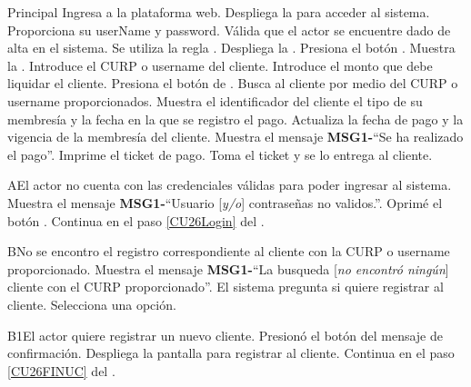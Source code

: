 	\begin{UCtrayectoria}{Principal}
		\UCpaso[\UCactor] Ingresa a la plataforma web.
		\UCpaso Despliega la  \label{CU26Login} para acceder al sistema.
		\UCpaso[\UCactor] Proporciona su userName y password. 
		\UCpaso Válida que el actor se encuentre dado de alta en el sistema. Se utiliza la regla  .
		\UCpaso Despliega la . \label{CU26PantallaRecepcionista}
		\UCpaso[\UCactor] Presiona el botón .
		\UCpaso Muestra la . \label{CU26RegistroPago}
		\UCpaso[\UCactor] Introduce el CURP o username del cliente.
		\UCpaso[\UCactor] Introduce el monto que debe liquidar el cliente.
		\UCpaso[\UCactor] Presiona el botón de . 
		\UCpaso Busca al cliente por medio del CURP o username proporcionados. 
		\UCpaso Muestra el identificador del cliente el tipo de su membresía y la fecha en la que se registro el pago.
		\UCpaso Actualiza la fecha de pago y la vigencia de la membresía del cliente.
		\UCpaso Muestra el mensaje {\bf MSG1-}``Se ha realizado el pago''.
		\UCpaso Imprime el ticket de pago.
		\UCpaso[\UCactor] Toma el ticket y se lo entrega al cliente.
		\label{CU26FINUC}
	\end{UCtrayectoria}
		
		\begin{UCtrayectoriaA}{A}{El actor no cuenta con las credenciales válidas para poder ingresar al sistema.}
			\UCpaso Muestra el mensaje {\bf MSG1-}``Usuario [{\em y/o}] contraseñas no validos.''.
			\UCpaso[\UCactor] Oprimé el botón .
			\UCpaso Continua en el paso \ref{CU26Login} del .
		\end{UCtrayectoriaA}
		
		\begin{UCtrayectoriaA}{B}{No se encontro el registro correspondiente al cliente con la CURP o username proporcionado.}
			\UCpaso Muestra el mensaje {\bf MSG1-}``La busqueda [{\em no encontró ningún}] cliente con el CURP proporcionado''.
			\UCpaso El sistema pregunta si quiere registrar al cliente.
			\UCpaso[\UCactor] Selecciona una opción.   
		\end{UCtrayectoriaA}

		\begin{UCtrayectoriaA}{B1}{El actor quiere registrar un nuevo cliente.}
			\UCpaso[\UCactor] Presionó el botón  del mensaje de confirmación.
			\UCpaso Despliega la pantalla para registrar al cliente.
			\UCpaso Continua en el paso \ref{CU26FINUC} del . 
		\end{UCtrayectoriaA}

